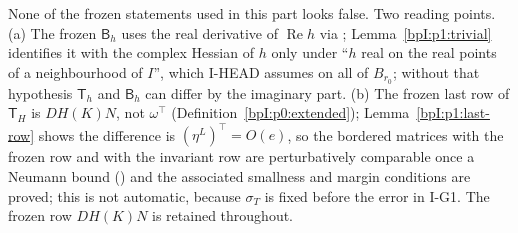 \begin{remark}\label{bpI:p1:doubts}
None of the frozen statements used in this part looks false. Two reading points. (a) The frozen $\mathsf B_h$ uses the real derivative of $\operatorname{Re}h$ via
; Lemma~\ref{bpI:p1:trivial} identifies it with the complex Hessian of $h$ only under ``$h$ real on the real points of a neighbourhood of $I$'',
which I-HEAD assumes on all of $B_{r_0}$; without that hypothesis $\mathsf T_h$ and $\mathsf B_h$ can differ by the imaginary part. (b) The frozen last row of $\mathsf T_H$ is
$DH(K)N$, not $\omega^\top$ (Definition~\ref{bpI:p0:extended}); Lemma~\ref{bpI:p1:last-row} shows the difference is $(\eta^L)^\top=O(e)$, so the bordered matrices with the frozen row and with the invariant row are perturbatively comparable once a Neumann bound
() and the associated smallness and margin conditions are proved; this is not automatic, because $\sigma_T$ is fixed before the error in I-G1. The frozen row $DH(K)N$ is retained throughout.
\end{remark}
